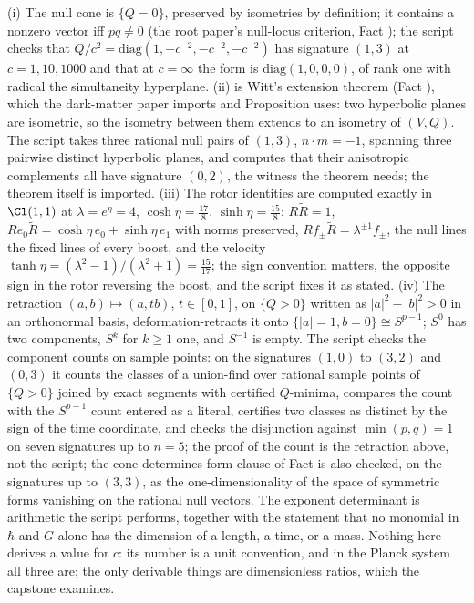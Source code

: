 (i) The null cone is $\{Q = 0\}$, preserved by isometries by definition; it contains a nonzero vector iff $pq \neq 0$ (the root paper's null-locus criterion, Fact ); the script checks that $Q/c^{2} = \mathrm{diag}(1, -c^{-2}, -c^{-2}, -c^{-2})$ has signature $(1,3)$ at $c = 1, 10, 1000$ and that at $c = \infty$ the form is $\mathrm{diag}(1, 0, 0, 0)$, of rank one with radical the simultaneity hyperplane. (ii) is Witt's extension theorem (Fact ), which the dark-matter paper imports and Proposition  uses: two hyperbolic planes are isometric, so the isometry between them extends to an isometry of $(V, Q)$. The script takes three rational null pairs of $(1,3)$, $n \cdot m = -1$, spanning three pairwise distinct hyperbolic planes, and computes that their anisotropic complements all have signature $(0,2)$, the witness the theorem needs; the theorem itself is imported. (iii) The rotor identities are computed exactly in $\Cl(1,1)$ at $\lambda = e^{\eta} = 4$, $\cosh\eta = \tfrac{17}{8}$, $\sinh\eta = \tfrac{15}{8}$: $R\tilde{R} = 1$, $Re_{0}\tilde{R} = \cosh\eta\,e_{0} + \sinh\eta\,e_{1}$ with norms preserved, $Rf_{\pm}\tilde{R} = \lambda^{\pm 1}f_{\pm}$, the null lines the fixed lines of every boost, and the velocity $\tanh\eta = (\lambda^{2} - 1)/(\lambda^{2} + 1) = \tfrac{15}{17}$; the sign convention matters, the opposite sign in the rotor reversing the boost, and the script fixes it as stated. (iv) The retraction $(a, b) \mapsto (a, tb)$, $t \in [0, 1]$, on $\{Q > 0\}$ written as $|a|^{2} - |b|^{2} > 0$ in an orthonormal basis, deformation-retracts it onto $\{|a| = 1, b = 0\} \cong S^{p-1}$; $S^{0}$ has two components, $S^{k}$ for $k \geq 1$ one, and $S^{-1}$ is empty. The script checks the component counts on sample points: on the signatures $(1,0)$ to $(3,2)$ and $(0,3)$ it counts the classes of a union-find over rational sample points of $\{Q > 0\}$ joined by exact segments with certified $Q$-minima, compares the count with the $S^{p-1}$ count entered as a literal, certifies two classes as distinct by the sign of the time coordinate, and checks the disjunction against $\min(p, q) = 1$ on seven signatures up to $n = 5$; the proof of the count is the retraction above, not the script; the cone-determines-form clause of Fact  is also checked, on the signatures up to $(3,3)$, as the one-dimensionality of the space of symmetric forms vanishing on the rational null vectors. The exponent determinant is arithmetic the script performs, together with the statement that no monomial in $\hbar$ and $G$ alone has the dimension of a length, a time, or a mass. Nothing here derives a value for $c$: its number is a unit convention, and in the Planck system all three are; the only derivable things are dimensionless ratios, which the capstone examines.
